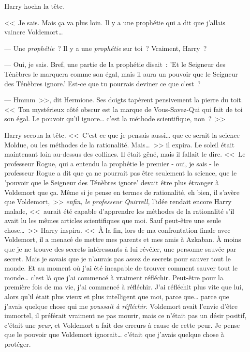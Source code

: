 Harry hocha la tête.

<<~Je sais. Mais ça va plus loin. Il y a une prophétie qui a dit que j'allais vaincre Voldemort…

--- Une \emph{prophétie}~? Il y a une \emph{prophétie} sur toi~? Vraiment, Harry~?

--- Oui, je sais. Bref, une partie de la prophétie disait~: 'Et le Seigneur des Ténèbres le marquera comme son égal, mais il aura un pouvoir que le Seigneur des Ténèbres ignore.' Est-ce que tu pourrais deviner ce que c'est~?

--- Hmmm~>>, dit Hermione. Ses doigts tapèrent pensivement la pierre du toit. <<~Ton mystérieux côté obscur est la marque de Vous-Savez-Qui qui fait de toi son égal. Le pouvoir qu'il ignore… c'est la méthode scientifique, non~?~>>

Harry secoua la tête. <<~C'est ce que je pensais aussi… que ce serait la science Moldue, ou les méthodes de la rationalité. Mais…~>> il expira. Le soleil était maintenant loin au-dessus des collines. Il était gêné, mais il fallait le dire. <<~Le professeur Rogue, qui a entendu la prophétie le premier - oui, je sais - le professeur Rogue a dit que ça ne pourrait pas être seulement la science, que le 'pouvoir que le Seigneur des Ténèbres ignore' devait être plus étranger à Voldemort que ça. Même si je pense en termes de rationalité, eh bien, il s'avère que Voldemort,~>> \emph{enfin, le professeur Quirrell,} l'idée rendait encore Harry malade, <<~aurait été capable d'apprendre les méthodes de la rationalité s'il avait lu les mêmes articles scientifiques que moi. Sauf peut-être une seule chose…~>> Harry inspira. <<~À la fin, lors de ma confrontation finale avec Voldemort, il a menacé de mettre mes parents et mes amis à Azkaban. À moins que je ne trouve des secrets intéressants à lui révéler, une personne sauvée par secret. Mais je savais que je n'aurais pas assez de secrets pour sauver tout le monde. Et au moment où j'ai été incapable de trouver comment sauver tout le monde… c'est là que j'ai commencé à vraiment réfléchir. Peut-être pour la première fois de ma vie, j'ai commencé à réfléchir. J'ai réfléchit plus vite que lui, alors qu'il était plus vieux et plus intelligent que moi, parce que… parce que j'avais quelque chose qui me \emph{poussait à réfléchir}. Voldemort avait l'envie d'être immortel, il préférait vraiment ne pas mourir, mais ce n'était pas un désir positif, c'était une \emph{peur}, et Voldemort a fait des erreurs à cause de cette peur. Je pense que le pouvoir que Voldemort ignorait… c'était que j'avais quelque chose à protéger.

